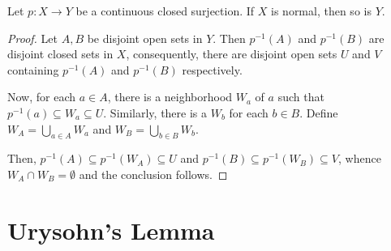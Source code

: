 \begin{theorem}
    Let $p: X\to Y$ be a continuous closed surjection. If $X$ is normal, then so is $Y$.
\end{theorem}
\begin{proof}
    Let $A,B$ be disjoint open sets in $Y$. Then $p^{-1}(A)$ and $p^{-1}(B)$ are disjoint closed sets in $X$, consequently, there are disjoint open sets $U$ and $V$ containing $p^{-1}(A)$ and $p^{-1}(B)$ respectively. 

    Now, for each $a\in A$, there is a neighborhood $W_a$ of $a$ such that $p^{-1}(a)\subseteq W_a\subseteq U$. Similarly, there is a $W_b$ for each $b\in B$. Define $W_A = \bigcup\limits_{a\in A} W_a$ and $W_B = \bigcup\limits_{b\in B} W_b$. 

    Then, $p^{-1}(A)\subseteq p^{-1}(W_A)\subseteq U$ and $p^{-1}(B)\subseteq p^{-1}(W_B)\subseteq V$, whence $W_A\cap W_B = \emptyset$ and the conclusion follows.
\end{proof}

\section{Urysohn's Lemma}

